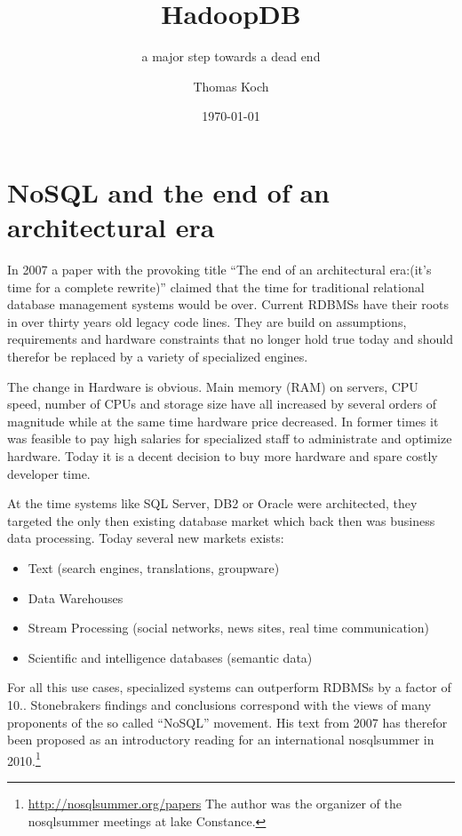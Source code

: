 \documentclass[12pt,a4paper]{scrartcl}		%
\begin{document}
\title{HadoopDB}
\subtitle{a major step towards a dead end}
\author{Thomas Koch}
\date{\today}
\maketitle{}

\begin{abstract}
  
\end{abstract}
\tableofcontents{}
\newpage{}

\section{NoSQL and the end of an architectural era}
In 2007 a paper with the provoking title ``The end of an architectural era:(it's time for a complete rewrite)''\cite{sto07} claimed that the time for traditional relational database management systems would be over. Current RDBMSs have their roots in over thirty years old legacy code lines. They are build on assumptions, requirements and hardware constraints that no longer hold true today and should therefor be replaced by a variety of specialized engines.

The change in Hardware is obvious. Main memory (RAM) on servers, CPU speed, number of CPUs and storage size have all increased by several orders of magnitude while at the same time hardware price decreased. In former times it was feasible to pay high salaries for specialized staff to administrate and optimize hardware. Today it is a decent decision to buy more hardware and spare costly developer time.

At the time systems like SQL Server, DB2 or Oracle were architected, they targeted the only then existing database market which back then was business data processing. Today several new markets exists:

\begin{itemize}
\item Text (search engines, translations, groupware)
\item Data Warehouses
\item Stream Processing (social networks, news sites, real time communication)
\item Scientific and intelligence databases (semantic data)
\end{itemize}

For all this use cases, specialized systems can outperform RDBMSs by a factor of 10.\cite{conf/cidr/StonebrakerBCCGHHLRZ07}. Stonebrakers findings and conclusions correspond with the views of many proponents of the so called ``NoSQL'' movement. His text from 2007 has therefor been proposed as an introductory reading for an international nosqlsummer in 2010.\footnote{\url{http://nosqlsummer.org/papers} The author was the organizer of the nosqlsummer meetings at lake Constance.} 
\end{document}
